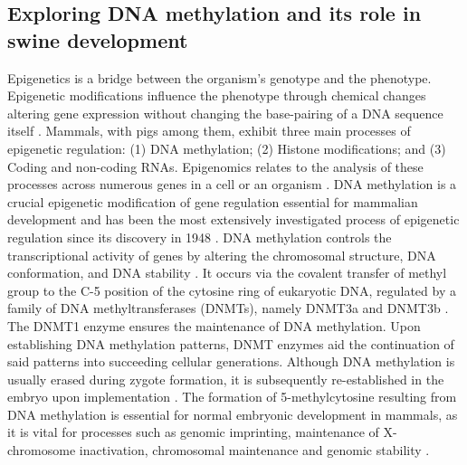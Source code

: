 \documentclass[
	a4paper, %
	10pt, %
	unnumberedsections, %
	twoside, %
]{LTJournalArticle}
\begin{document}
\subsection{\normalsize Exploring DNA methylation and its role in swine development} 
Epigenetics is a bridge between the organism's genotype and the phenotype. 
Epigenetic modifications influence the phenotype through chemical changes altering 
gene expression 
without changing the base-pairing of a DNA sequence itself \autocite{goldberg2007a}. 
Mammals, with pigs among them, exhibit three main processes of epigenetic regulation: 
(1) DNA methylation; (2) Histone modifications; and (3) Coding and non-coding RNAs. 
Epigenomics relates to the analysis of these processes across numerous genes in a 
cell or an organism \autocite{champroux2018a}. DNA methylation is a crucial epigenetic 
modification of gene regulation essential for mammalian development and 
has been the most extensively investigated process of epigenetic regulation since its 
discovery in 1948 \autocite{villica2021a}. DNA methylation 
controls the transcriptional activity of genes by altering the chromosomal structure, 
DNA conformation, and DNA stability \autocite{wang2018a}.
It occurs via the covalent transfer of methyl group to the C-5 position of the 
cytosine ring of eukaryotic DNA, regulated by a family of DNA methyltransferases (DNMTs), 
namely DNMT3a and DNMT3b \autocite{jin2011a, ito2022a}. 
The DNMT1 enzyme ensures the maintenance of DNA methylation. Upon establishing DNA 
methylation patterns, DNMT enzymes aid the 
continuation of said patterns into succeeding cellular generations. 
Although DNA methylation is usually erased during zygote 
formation, it is subsequently re-established in the embryo upon implementation 
\autocite{jin2011a}. The formation of 5-methylcytosine resulting 
from DNA methylation is essential for normal embryonic development in mammals, 
as it is vital for processes such as genomic 
imprinting, maintenance of X-chromosome inactivation, chromosomal maintenance and 
genomic stability \autocite{champroux2018a, villica2021a, jin2011a}.\newline
\end{document}
